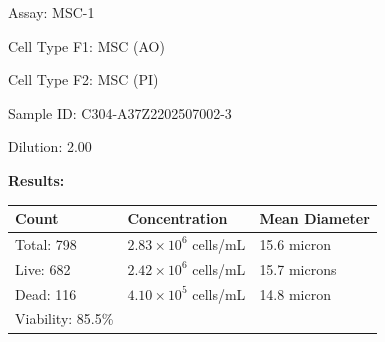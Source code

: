 \documentclass[UTF8,10pt,a4paper,fontset=fandol]{ctexart}
\newcommand{\fieldvalue}[1]{#1}
\begin{document}
\newpage

\noindent Assay: 
\fieldvalue{MSC-1}

\medskip
\noindent Cell Type F1: 
\fieldvalue{MSC (AO)}

\noindent Cell Type F2: 
\fieldvalue{MSC (PI)}

\medskip
\noindent Sample ID: 
\fieldvalue{C304-A37Z2202507002-3}

\noindent Dilution: 
\fieldvalue{2.00}

\bigskip
\noindent\hrulefill

\noindent\textbf{Results:}

\medskip
\begin{tabularx}{\textwidth}{@{}>{\raggedright\arraybackslash}X
                                >{\raggedright\arraybackslash}X
                                >{\raggedright\arraybackslash}X@{}}
\textbf{Count} & \textbf{Concentration} & \textbf{Mean Diameter} \\[-1mm]
\hline
Total:
\fieldvalue{798}
&
\fieldvalue{$2.83\times 10^{6}$ cells/mL}
&
\fieldvalue{15.6 micron}
\\
Live:
\fieldvalue{682}
&
\fieldvalue{$2.42\times 10^{6}$ cells/mL}
&
\fieldvalue{15.7 microns}
\\
Dead:
\fieldvalue{116}
&
\fieldvalue{$4.10\times 10^{5}$ cells/mL}
&
\fieldvalue{14.8 micron}
\\
Viability:
\fieldvalue{85.5\%}
&
&
\end{tabularx}
\end{document}
